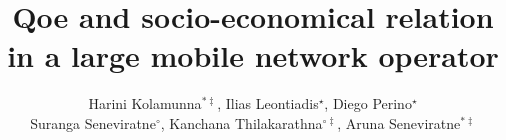 \documentclass[sigconf]{acmart}
\begin{document}
	\title{Qoe and socio-economical relation in a large mobile network operator}
	
	
	\author{Harini Kolamunna$^{\ast\ddagger}$, Ilias Leontiadis$^\star$, Diego Perino$^\star$ \\ Suranga Seneviratne$^\circ$, Kanchana Thilakarathna$^{\circ\ddagger}$, Aruna Seneviratne$^{\ast\ddagger}$} 
	
\end{document}
